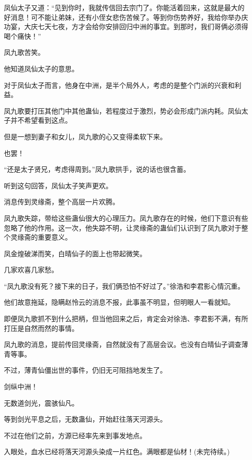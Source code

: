 \begin{this_body}
凤仙太子又道：“见到你时，我就传信回去宗门了。你能活着回来，这就是最大的好消息！可不能让弟妹，还有小侄女悲伤苦候了。等到你伤势养好，我给你举办庆功宴，大庆七天七夜，方才会给你安排回归中洲的事宜。到那时，我们哥俩必须得喝个痛快！”

凤九歌苦笑。

他知道凤仙太子的意思。

对于凤仙太子而言，他身在中洲，是半个局外人，考虑的是整个门派的兴衰和利益。

凤九歌要打压其他门中其他蛊仙，若程度过于激烈，势必会形成门派内耗。凤仙太子并不希望看到这点。

但是一想到妻子和女儿，凤九歌的心又变得柔软下来。

也罢！

“还是太子贤兄，考虑得周到。”凤九歌拱手，说的话也很含蓄。

听到这句回答，凤仙太子笑声更欢。

消息传到灵缘斋，整个高层一片欢腾。

凤九歌失踪，带给这些蛊仙很大的心理压力。凤九歌存在的时候，他们下意识有些忽略了他的作用。这一次，他失踪不明，让灵缘斋的蛊仙们认识到了凤九歌对于整个灵缘斋的重要意义。

凤金煌破涕而笑，白晴仙子的面上也带起微笑。

几家欢喜几家愁。

“凤九歌没有死？接下来的日子，我们俩恐怕不好过了。”徐浩和李君影心情沉重。

他们故意拖延，隐瞒赵怜云的消息不报，此事虽不明显，但明眼人一看就知。

即便凤九歌抓不到什么把柄，但当他回来之后，肯定会对徐浩、李君影不满，有所打压是自然而然的事情。

凤九歌的消息，提前传回灵缘斋，自然就没有了高层会议。也没有白晴仙子调查薄青等事。

不过，薄青仙僵出世的事件，仍旧无可阻挡地发生了。

剑纵中洲！

无数道剑光，震骇仙凡。

等到剑光平息之后，无数蛊仙，开始赶往落天河源头。

不过在他们之前，方源已经率先来到事发地点。

入眼处，血水已经将落天河源头染成一片红色。满眼都是仙材！(未完待续。)

\end{this_body}

